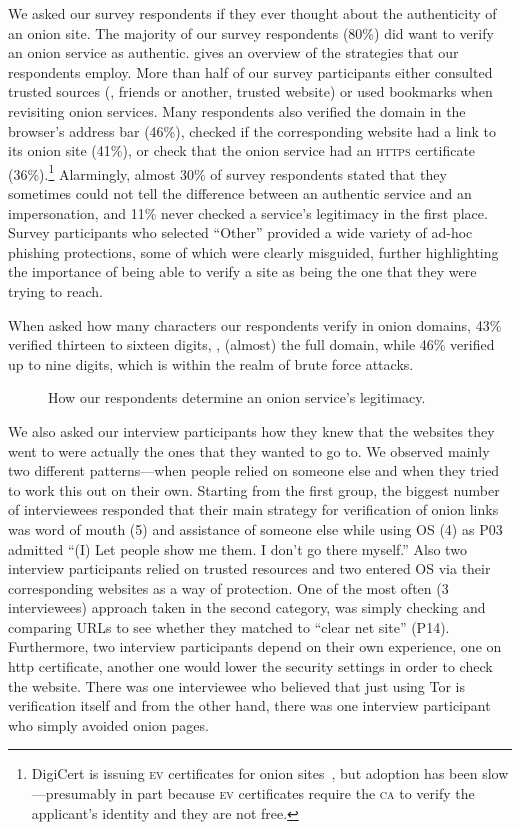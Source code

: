 We asked our survey respondents if they ever thought about the authenticity of
an onion site.  The majority of our survey respondents (80\%) did want to verify
an onion service as authentic.   gives an
overview of the strategies that our respondents employ.  More than half of our
survey participants either consulted trusted sources (\eg, friends or another,
trusted website) or used bookmarks when revisiting onion services.  Many
respondents also verified the domain in the browser's address bar (46\%),
checked if the corresponding website had a link to its onion site (41\%), or
check that the onion service had an \textsc{https} certificate
(36\%).\footnote{DigiCert is issuing \textsc{ev} certificates for onion
sites~\cite{DigiCert2015a}, but adoption has been slow---presumably in part
because \textsc{ev} certificates require the \textsc{ca} to verify the
applicant's identity and they are not free.}  Alarmingly, almost 30\% of survey
respondents stated that they sometimes could not tell the difference between an
authentic service and an impersonation, and 11\% never checked a service's
legitimacy in the first place.  Survey participants who selected ``Other''
provided a wide variety of ad-hoc phishing protections, some of which were
clearly misguided,  further
highlighting the importance of being able to verify a site as being the one that
they were trying to reach.

When asked how many characters our respondents verify in onion domains,  43\%
verified thirteen to sixteen digits, \ie, (almost) the full domain, while 46\%
verified up to nine digits, which is within the realm of brute force attacks.

\begin{figure}[t]
    \centering
    
    \caption{How our respondents determine an onion service's legitimacy.}
    \label{fig:determining-legitimacy}
\end{figure}


We also asked our interview participants how they knew that the websites they
went to were actually the ones that they wanted to go to.  We observed mainly
two different patterns---when people relied on someone else and when they tried
to work this out on their own. Starting from the first group, the biggest number
of interviewees responded that their main strategy for verification of onion
links was word of mouth (5) and assistance of someone else while using OS (4) as
P03 admitted ``(I) Let people show me them. I don't go there myself.''  Also two
interview participants relied on trusted resources and two entered OS via their
corresponding websites as a way of protection. One of the most often (3
interviewees) approach taken in the second category, was simply checking and
comparing URLs to see whether they matched to ``clear net site'' (P14).
Furthermore, two interview participants depend on their own experience, one on
http certificate, another one would lower the security settings in order to
check the website. There was one interviewee who believed that just using Tor is
verification itself and from the other hand, there was one interview participant
who simply avoided onion pages.

